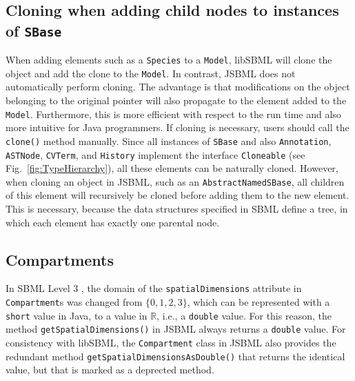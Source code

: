 \subsection{Cloning when adding child nodes to instances of \texttt{SBase}}

When adding elements such as a \texttt{Species}
%
to a \texttt{Model}, libSBML will
clone the object and add the clone to the \texttt{Model}. In contrast,
JSBML does
not automatically perform cloning. The advantage is that modifications on the
object belonging to the original pointer will also propagate to the element
added to the \texttt{Model}. Furthermore, this is more efficient with respect to
the run time and also more intuitive for Java programmers. If cloning is
necessary, users should call the \texttt{clone()} method manually. Since all instances of \texttt{SBase} and also
\texttt{Annotation}, \texttt{ASTNode}, \texttt{CVTerm}, and \texttt{History} implement
the interface \texttt{Cloneable} (see Fig.~\vref{fig:TypeHierarchy}), all these
elements can be naturally cloned. However, when cloning an object in
JSBML, such as an \texttt{AbstractNamedSBase},
%
all children of this element will recursively be cloned before adding them to
the new element. This is necessary, because the data structures specified in
SBML
%
define a tree, in which each element has exactly one parental node.

\subsection{Compartments}

In SBML Level 3
%
\citep{Hucka2010a}, the domain of the \texttt{spatialDimensions} attribute in
\texttt{Compartment}s was changed from $\lbrace 0, 1, 2, 3\rbrace$, which can be
represented with a \texttt{short} value in Java, to a value in $\mathbb{R}$,
i.e., a \texttt{double} value. For this reason, the method
\texttt{getSpatialDimensions()} in JSBML
always returns a \texttt{double} value. For consistency with libSBML, the
\texttt{Compartment} class in JSBML also provides the redundant method
\texttt{getSpatialDimensionsAsDouble()} that returns the identical value, but
that is marked as a deprected method.
%
%
%


